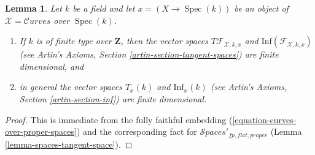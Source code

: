 \documentclass{stacks-project}
\theoremstyle{plain}
\newtheorem{lemma}[subsection]{Lemma}
\theoremstyle{definition}
\theoremstyle{remark}
\numberwithin{equation}{subsection}
\def\Spec{\mathop{\mathrm{Spec}}}
\def\Spacesstack{\mathcal{S}\!\mathit{paces}}
\def\Curvesstack{\mathcal{C}\!\mathit{urves}}
\begin{document}
\begin{lemma}
\label{lemma-curves-tangent-space}
Let $k$ be a field and let $x = (X \to \Spec(k))$ be an object of
$\mathcal{X} = \Curvesstack$ over $\Spec(k)$.
\begin{enumerate}
\item If $k$ is of finite type over $\mathbf{Z}$, then
the vector spaces $T\mathcal{F}_{\mathcal{X}, k, x}$ and
$\text{Inf}(\mathcal{F}_{\mathcal{X}, k, x})$
(see Artin's Axioms, Section \ref{artin-section-tangent-spaces})
are finite dimensional, and
\item in general the vector spaces $T_x(k)$ and $\text{Inf}_x(k)$
(see Artin's Axioms, Section \ref{artin-section-inf})
are finite dimensional.
\end{enumerate}
\end{lemma}

\begin{proof}
This is immediate from the fully faithful embedding
(\ref{equation-curves-over-proper-spaces}) and
the corresponding fact for $\Spacesstack'_{fp, flat, proper}$
(Lemma \ref{lemma-spaces-tangent-space}).
\end{proof}
\end{document}
